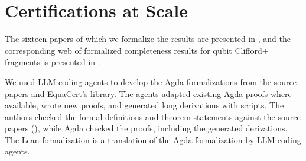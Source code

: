 \documentclass[acmsmall,screen,nonacm]{acmart}
\begin{document}
\FloatBarrier

\fi







\section{Certifications at Scale}\label{sec:corpus}

The sixteen papers of which we formalize the results are presented in , and the corresponding web of formalized completeness results for qubit Clifford+\T{} fragments is presented in .

We used LLM coding agents to develop the Agda formalizations from the
source papers and EquaCert's library. The agents adapted existing Agda
proofs where available, wrote new proofs, and generated long
derivations with scripts. The authors checked the formal definitions
and theorem statements against the source papers
(), while Agda checked the proofs, including the
generated derivations. The Lean formalization is a translation of the
Agda formalization by LLM coding agents.
\end{document}
